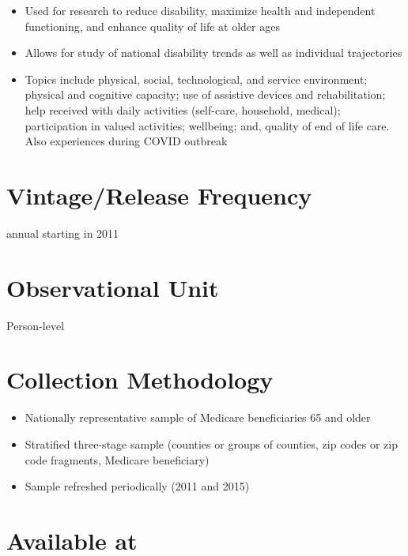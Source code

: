 \documentclass[
]{book}
\providecommand{\tightlist}{%
  \setlength{\itemsep}{0pt}\setlength{\parskip}{0pt}}
\begin{document}
\begin{itemize}
\tightlist
\item
  Used for research to reduce disability, maximize health and independent functioning, and enhance quality of life at older ages
\item
  Allows for study of national disability trends as well as individual trajectories
\item
  Topics include physical, social, technological, and service environment; physical and cognitive capacity; use of assistive devices and rehabilitation; help received with daily activities (self-care, household, medical); participation in valued activities; wellbeing; and, quality of end of life care. Also experiences during COVID outbreak
\end{itemize}

\hypertarget{vintagerelease-frequency-48}{%
\section{Vintage/Release Frequency}\label{vintagerelease-frequency-48}}

annual starting in 2011

\hypertarget{observational-unit-48}{%
\section{Observational Unit}\label{observational-unit-48}}

Person-level

\hypertarget{collection-methodology-48}{%
\section{Collection Methodology}\label{collection-methodology-48}}

\begin{itemize}
\tightlist
\item
  Nationally representative sample of Medicare beneficiaries 65 and older
\item
  Stratified three-stage sample (counties or groups of counties, zip codes or zip code fragments, Medicare beneficiary)
\item
  Sample refreshed periodically (2011 and 2015)
\end{itemize}

\hypertarget{available-at-48}{%
\section{Available at}\label{available-at-48}}
\end{document}
